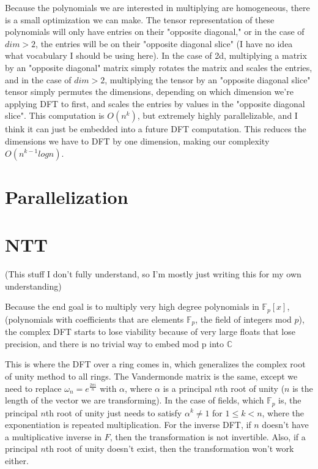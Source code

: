 \documentclass{article}
\begin{document}
Because the polynomials we are interested in multiplying are homogeneous, there is a small optimization we can make. The tensor representation of these polynomials will only have entries on their "opposite diagonal," or in the case of $dim > 2$, the entries will be on their "opposite diagonal slice" (I have no idea what vocabulary I should be using here). In the case of 2d, multiplying a matrix by an "opposite diagonal" matrix simply rotates the matrix and scales the entries, and in the case of $dim>2$, multiplying the tensor by an "opposite diagonal slice" tensor simply permutes the dimensions, depending on which dimension we're applying DFT to first, and scales the entries by values in the "opposite diagonal slice". This computation is $O(n^k)$, but extremely highly parallelizable, and I think it can just be embedded into a future DFT computation. This reduces the dimensions we have to DFT by one dimension, making our complexity $O(n^{k-1} log n)$.

\section{Parallelization}

\section{NTT}
(This stuff I don't fully understand, so I'm mostly just writing this for my own understanding)

Because the end goal is to multiply very high degree polynomials in $\mathbb{F}_p[x]$, (polynomials with coefficients that are elements $\mathbb{F}_p$, the field of integers mod $p$), the complex DFT starts to lose viability because of very large floats that lose precision, and there is no trivial way to embed mod p into $\mathbb{C}$

This is where the DFT over a ring comes in, which generalizes the complex root of unity method to all rings. The Vandermonde matrix is the same, except we need to replace $\omega_n=e^{\frac{2\pi i}{n}}$ with $\alpha$, where $\alpha$ is a principal $n$th root of unity ($n$ is the length of the vector we are transforming). In the case of fields, which $\mathbb{F}_p$ is, the principal $n$th root of unity just needs to satisfy $\alpha^k\ne1$ for $1\le k<n$, where the exponentiation is repeated multiplication. For the inverse DFT, if $n$ doesn't have a multiplicative inverse in $F$, then the transformation is not invertible. Also, if a principal $n$th root of unity doesn't exist, then the transformation won't work either.
\end{document}
